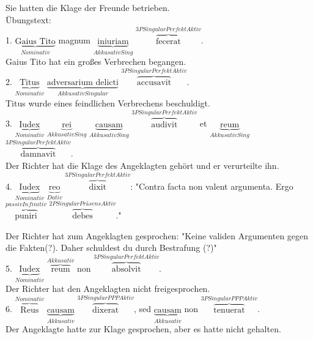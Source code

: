 \documentclass[a4paper]{article}
\newcommand{\ann}[2]{$\underbrace{\text{#1}}_{#2}$}
\newcommand{\ovv}[2]{$\overbrace{\text{#1}}^{#2}$}
\begin{document}
Sie hatten die Klage der Freunde betrieben. \\

Übungstext: \\

1. \ann{Gaius Tito}{Nominativ} magnum \ann{iniuriam}{Akkusativ Sing} \ovv{fecerat}{3P Singular Perfekt Aktiv}. \\

Gaius Tito hat ein großes Verbrechen begangen. \\

2. \ann{Titus}{Nominativ} \ann{adversarium delicti}{Akkusativ Singular} \ovv{accusavit}{3P Singular Perfekt Aktiv}. \\

Titus wurde eines feindlichen Verbrechens beschuldigt. \\

3. \ann{Iudex}{Nominativ} \ann{rei}{Akkusativ Sing} \ann{causam}{Akkusativ Sing} \ovv{audivit}{3P Singular Perfekt Aktiv} et \ann{reum}{Akkusativ Sing} \ovv{damnavit}{3P Singular Perfekt Aktiv}. \\

Der Richter hat die Klage des Angeklagten gehört und er verurteilte ihn.\\

4. \ann{Iudex}{Nominativ} \ann{reo}{Dativ} \ovv{dixit}{3P Singular Perfekt Aktiv}: "Contra facta non valent argumenta. Ergo \ovv{puniri}{passiv Infinitiv} \ovv{debes}{2P Singular Präsens Aktiv}."

Der Richter hat zum Angeklagten gesprochen: "Keine validen Argumenten gegen die Fakten(?). Daher schuldest du durch Bestrafung (?)" \\

5. \ann{Iudex}{Nominativ} \ovv{reum}{Akkusativ} non \ovv{absolvit}{3P Singular Perfekt Aktiv}. \\ 

Der Richter hat den Angeklagten nicht freigesprochen. \\

6. \ovv{Reus}{Nominativ} \ann{causam}{Akkusativ} \ovv{dixerat}{3P Singular PPP Aktiv}, sed \ann{causam}{Akkusativ} non \ovv{tenuerat}{3P Singular PPP Aktiv}. \\

Der Angeklagte hatte zur Klage gesprochen, aber es hatte nicht gehalten.
\end{document}
